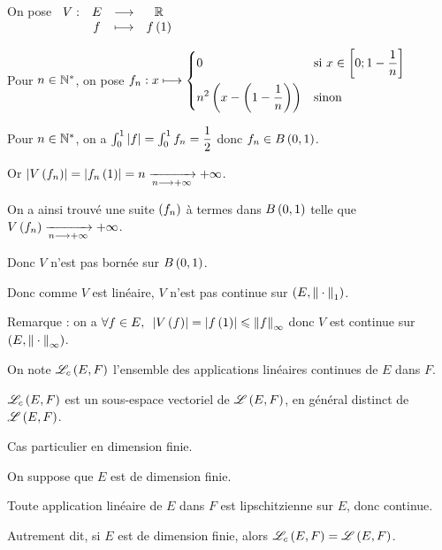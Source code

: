 \begin{corr}
On pose \(\begin{array}[t]{cccc}V : & E & \longrightarrow & \mathbb{R} \\ & f & \longmapsto & f\left(1\right)\end{array}\)

Pour \(n\in\mathbb{N}^*\), on pose \(f_n:x\longmapsto\begin{dcases}
0 &\text{si }x\in\left[0;1-\dfrac{1}{n}\right] \\
n^2\left(x-\left(1-\dfrac{1}{n}\right)\right) &\text{sinon}
\end{dcases}\)

Pour \(n\in\mathbb{N}^*\), on a \(\int_0^1\left\lvert f\right\rvert=\int_0^1f_n=\dfrac{1}{2}\) donc \(f_n\in\bouleo{0}{1}\).

Or \(\left\lvert V\left(f_n\right)\right\rvert=\left\lvert f_n\left(1\right)\right\rvert=n\xrightarrow[n\longrightarrow+\infty]{}+\infty\).

On a ainsi trouvé une suite \(\left(f_n\right)\) à termes dans \(\bouleo{0}{1}\) telle que \(V\left(f_n\right)\xrightarrow[n\longrightarrow+\infty]{}+\infty\).

Donc \(V\) n'est pas bornée sur \(\bouleo{0}{1}\).

Donc comme \(V\) est linéaire, \(V\) n'est pas continue sur \(\groupe{E}[\norme{}_1]\).

Remarque : on a \(\quantifs{\forall f\in E}\abs{V\paren{f}}=\abs{f\paren{1}}\leq\norme{f}_\infty\) donc \(V\) est continue sur \(\groupe{E}[\norme{}_\infty]\).
\end{corr}

\begin{defi}
On note \(\mathscr{L}_c\left(E,F\right)\) l'ensemble des applications linéaires continues de \(E\) dans \(F\).
\end{defi}

\begin{prop}
\(\mathscr{L}_c\left(E,F\right)\) est un sous-espace vectoriel de \(\mathscr{L}\left(E,F\right)\), en général distinct de \(\mathscr{L}\left(E,F\right)\).
\end{prop}

Cas particulier en dimension finie.

\begin{theo}
On suppose que \(E\) est de dimension finie.

Toute application linéaire de \(E\) dans \(F\) est lipschitzienne sur \(E\), donc continue.

Autrement dit, si \(E\) est de dimension finie, alors \(\mathscr{L}_c\left(E,F\right)=\mathscr{L}\left(E,F\right)\).
\end{theo}

